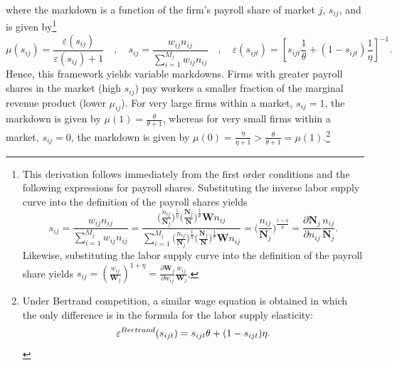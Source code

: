 \documentclass[12pt]{article}
\theoremstyle{prop}
\begin{document}
where the markdown is a function of the firm's payroll share of market $j$, $s_{ij}$, and is given by\footnote{
    This derivation follows immediately from the first order conditions and the following expressions for payroll shares. Substituting the inverse labor supply curve into the definition of the payroll shares yields $$s_{ij}=\frac{w_{ij} n_{ij}}{\sum_{i=1}^{M_j} w_{ij} n_{ij}}=\frac{ \Bigg(\frac{n_{ij}}{\mathbf{N}_{j}}\Bigg)^\frac{1}{\eta}\Bigg(\frac{\mathbf{N}_{j}}{\mathbf{N}}\Bigg)^\frac{1}{\theta} \textbf{W}  n_{ij}}{\sum_{i=1}^{M_j}  \Bigg(\frac{n_{ij}}{\mathbf{N}_{j}}\Bigg)^\frac{1}{\eta}\Bigg(\frac{\mathbf{N}_{j}}{\mathbf{N}}\Bigg)^\frac{1}{\theta} \textbf{W}  n_{ij}}=\Big(\frac{n_{ij}}{\mathbf{N}_j}\Big)^{\frac{1+\eta}{\eta}}  = \frac{\partial \mathbf{N}_j}{\partial n_{ij}} \frac{n_{ij}}{\mathbf{N}_j}. $$
	Likewise, substituting the labor supply curve into the definition of the payroll share yields $s_{ij}  =\left(\frac{w_{ij}}{\mathbf{W}_{j}}\right)^{1+\eta}=\frac{\partial\mathbf{W}_{j}}{\partial w_{ij}}\frac{w_{ij}}{\mathbf{W}_{j}}$. }%
\begin{equation}\label{eq:markdown}
	\mu(s_{ij}) = \frac{\varepsilon(s_{ij})}{\varepsilon(s_{ij})+1}  \quad,\quad s_{ij}=\frac{w_{ij} n_{ij}}{\sum_{i=1}^{M_j} w_{ij} n_{ij}} \quad,\quad \varepsilon(s_{ijt}) = \left[s_{ijt}\frac{1}{\theta} + (1-s_{ijt})\frac{1}{\eta}\right]^{-1}.
\end{equation}%
Hence, this framework yields variable markdowns.
Firms with greater payroll shares  in the market (high $s_{ij}$) pay workers a smaller fraction of the marginal revenue product (lower $\mu_{ij}$).
For very large firms within a market, $s_{ij}=1$, the markdown is given by $\mu(1)=\frac{\theta}{\theta+1}$, whereas for very small firms within a market, $s_{ij}=0$, the markdown is given by $\mu(0)=\frac{\eta}{\eta+1}>\frac{\theta}{\theta+1}=\mu(1)$.\footnote{ Under Bertrand competition, a similar wage equation is obtained in which the only difference is in the formula for the labor supply elasticity:
{\vspace{-.2cm}\begin{equation}\label{eq:markdown_bertrand}
 \varepsilon^{Bertrand}(s_{ijt}) =  s_{ijt} \theta  + (1-s_{ijt}) \eta .
\vspace{-.2cm}\end{equation}}
}
\end{document}
